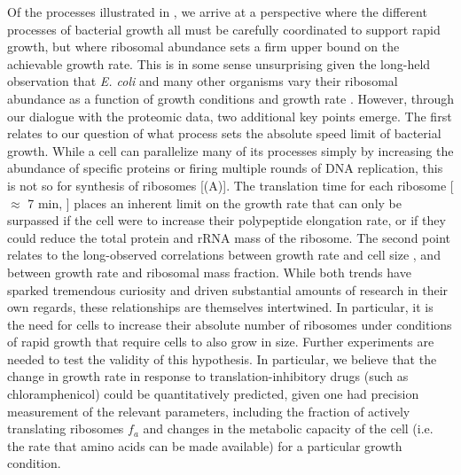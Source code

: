 Of the processes illustrated in , we arrive at a
perspective where the different processes of bacterial growth all must be carefully
coordinated to support rapid growth, but where ribosomal abundance sets a firm
upper bound on the achievable growth rate. This is in some sense
unsurprising given the long-held observation that \textit{E. coli} and many
other organisms vary their ribosomal abundance as a function of growth
conditions and growth rate \citep{scott2010, metzlraz2017}. However, through our
dialogue with the proteomic data, two additional key points emerge. The first
relates to our question of what process sets the absolute speed limit of
bacterial growth. While a cell can parallelize many of its processes simply by
increasing the abundance of specific proteins or firing multiple rounds of DNA
replication, this is not so for synthesis of ribosomes
[(A)]. The translation time for each ribosome [$\approx$ 7
min, \cite{dill2011}] places an inherent limit on the growth rate that can only
be surpassed if the cell were to increase their polypeptide elongation rate, or
if they could reduce the total protein and rRNA mass of the ribosome. The second
point relates to the long-observed correlations between growth rate and cell
size \citep{schaechter1958, si2017}, and between growth rate and ribosomal mass
fraction. While both trends have sparked tremendous curiosity and driven
substantial amounts of research in their own regards, these relationships are
themselves intertwined. In particular, it is the need for cells to increase
their absolute number of ribosomes under conditions of rapid growth that require
cells to also grow in size. Further experiments are needed to test the validity
of this hypothesis. In particular, we believe that the change in growth rate in
response to translation-inhibitory drugs (such as chloramphenicol) could be
quantitatively predicted, given one had precision measurement of the relevant
parameters, including the fraction of actively translating ribosomes $f_a$ and
changes in the metabolic capacity of the cell (i.e. the rate that amino acids can be made
available) for a particular growth condition.

